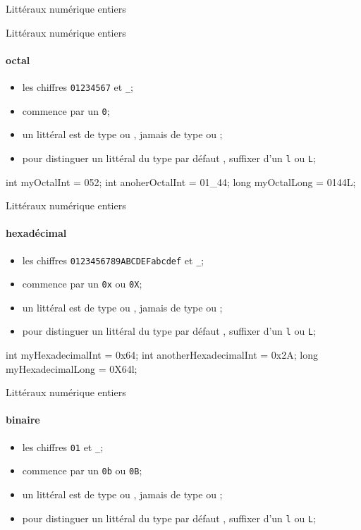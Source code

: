 \begin{hideedit}
\begin{frame}[fragile]{Littéraux numérique entiers}
\end{frame}

\begin{frame}[fragile]{Littéraux numérique entiers}
  \framesubtitle{octal}
  \begin{itemize}
    \item les chiffres \texttt{01234567} et \texttt{\_};
    \item commence par un \texttt{0};
    \item un littéral est de type  ou , jamais de type 
       ou ;
    \item pour distinguer un littéral  du type par défaut , suffixer 
      d'un \texttt{l} ou \texttt{L};
  \end{itemize}

  \pause
  \begin{java}
int myOctalInt = 052;
int anoherOctalInt = 01_44;
long myOctalLong = 0144L;
  \end{java}
\end{frame}

\begin{frame}[fragile]{Littéraux numérique entiers}
  \framesubtitle{hexadécimal}
  \begin{itemize}
    \item les chiffres \texttt{0123456789ABCDEFabcdef} et \texttt{\_};
    \item commence par un \texttt{0x} ou \texttt{0X};
    \item un littéral est de type  ou , jamais de type 
       ou ;
    \item pour distinguer un littéral  du type par défaut , suffixer 
      d'un \texttt{l} ou \texttt{L};
  \end{itemize}

  \pause
  \begin{java}
int myHexadecimalInt = 0x64;
int anotherHexadecimalInt = 0x2A;
long myHexadecimalLong = 0X64l;
  \end{java}
\end{frame}

\begin{frame}[fragile]{Littéraux numérique entiers}
  \framesubtitle{binaire}
  \begin{itemize}
    \item les chiffres \texttt{01} et \texttt{\_};
    \item commence par un \texttt{0b} ou \texttt{0B};
    \item un littéral est de type  ou , jamais de type 
       ou ;
    \item pour distinguer un littéral  du type par défaut , suffixer 
      d'un \texttt{l} ou \texttt{L};
  \end{itemize}


\end{frame}
\end{hideedit}
